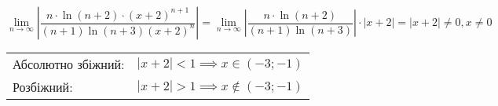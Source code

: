 \documentclass[../rgr_2.tex]{subfiles}
\begin{document}
\Solution

\begin{equation}
	\lim_{n\to\infty} \left|
		\frac
		{n \cdot \ln(n+2)\cdot (x+2)^{n+1}}
		{(n+1) \ln(n+3)(x+2)^n}
		\right|
	= \lim_{n\to\infty} \left|
		\frac
		{n \cdot \ln(n+2)}
		{(n+1) \ln(n+3)}
		\right|
		\cdot |x+2|
	= |x+2| \neq 0, x\neq 0
\end{equation}

\begin{tabular}{lc}
	Абсолютно збіжний: &
	$|x+2| < 1 \implies x \in (-3;-1)$ \\

	Розбіжний: &
	$|x+2| > 1 \implies x \notin (-3;-1)$ \\
\end{tabular}

\end{document}
